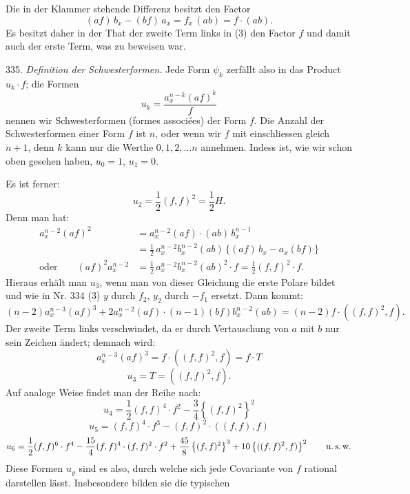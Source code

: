 \documentclass[11pt]{article}
\providecommand{\weberpage}[1]{}
\begin{document}
\weberpage{357}
Die in der Klammer stehende Differenz besitzt den Factor
\[
(af)\,b_x - (bf)\,a_x = f_x\,(ab) = f\cdot (ab).
\]
Es besitzt daher in der That der zweite Term links in (3) den Factor
$f$ und damit auch der erste Term, was zu beweisen war.

335. \textit{Definition der Schwesterformen.} Jede Form $\psi_k$ zerfällt also
in das Product $u_k\cdot f$; die Formen
\[
u_k = \frac{a_x^{n-k}(af)^k}{f}
\]
nennen wir \glqq Schwesterformen\grqq{} (formes associées) der Form $f$. Die
Anzahl der Schwesterformen einer Form $f$ ist $n$, oder wenn wir $f$ mit
einschliessen gleich $n+1$, denn $k$ kann nur die Werthe $0, 1, 2, \dots n$
annehmen. Indess ist, wie wir schon oben gesehen haben, $u_0=1$,
$u_1=0$.

Es ist ferner:
\[
u_2 = \frac{1}{2}(f,f)^2 = \frac{1}{2}H.
\]
Denn man hat:
\[
\begin{aligned}
a_x^{n-2}(af)^2 &= a_x^{n-2}(af)\cdot(ab)\,b_x^{n-1}\\
&= \frac{1}{2}\,a_x^{n-2}b_x^{n-2}(ab)\,\{(af)\,b_x - a_x(bf)\}\\
\text{oder}\qquad (af)^2 a_x^{n-2} &= \frac{1}{2}\,a_x^{n-2}b_x^{n-2}(ab)^2\cdot f = \frac{1}{2}(f,f)^2\cdot f.
\end{aligned}
\]
Hieraus erhält man $u_3$, wenn man von dieser Gleichung die erste
Polare bildet und wie in Nr. 334 (3) $y$ durch $f_2$, $y_2$ durch
$-f_1$ ersetzt. Dann kommt:
\[
(n-2)a_x^{n-3}(af)^3+2a_x^{n-2}(af)\cdot(n-1)(bf)b_x^{n-2}(ab)=(n-2)f\cdot((f,f)^2,f).
\]
Der zweite Term links verschwindet, da er durch Vertauschung von
$a$ mit $b$ nur sein Zeichen ändert; demnach wird:
\[
a_x^{n-3}(af)^3 = f\cdot((f,f)^2,f) = f\cdot T
\]
\[
u_3 = T = ((f,f)^2,f).
\]
Auf analoge Weise findet man der Reihe nach:
\[
u_4 = \frac{1}{2}(f,f)^4\cdot f^2 - \frac{3}{4}\left\{(f,f)^2\right\}^2
\]
\[
u_5 = (f,f)^4\cdot f^3 - (f,f)^2\cdot((f,f),f)
\]
\[
u_6 = \frac{1}{2}(f,f)^6\cdot f^4 - \frac{15}{4}(f,f)^4\cdot(f,f)^2\cdot f^2 + \frac{45}{8}\left\{(f,f)^2\right\}^3 + 10\left\{((f,f)^2,f)\right\}^2 \qquad \text{u.\,s.\,w.}
\]
Diese Formen $u_\varrho$ sind es also, durch welche sich jede Covariante von
$f$ rational darstellen lässt. Insbesondere bilden sie die typischen
\end{document}
